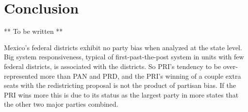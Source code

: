 \documentclass[letter,12pt]{article}
\begin{document}


\section{Conclusion}

** To be written **

Mexico's federal districts exhibit no party bias when analyzed at the state level. Big system responsiveness, typical of first-past-the-post system in units with few federal districts, is associated with the districts. So PRI's tendency to be over-represented more than PAN and PRD, and the PRI's winning of a couple extra seats with the redistricting proposal is not the product of partisan bias. If the PRI wins more this is due to its status as the largest party in more states that the other two major parties combined. 


%

\end{document}
